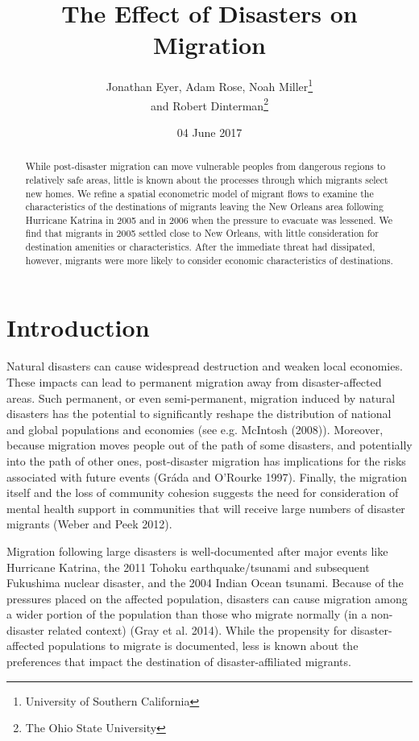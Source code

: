 \documentclass[]{article}
\title{The Effect of Disasters on Migration}
\author{Jonathan Eyer, Adam Rose, Noah Miller\footnote{University of Southern
  California} \\ and Robert Dinterman\footnote{The Ohio State University}}
\date{04 June 2017}
\begin{document}
\maketitle
\begin{abstract}
While post-disaster migration can move vulnerable peoples from dangerous
regions to relatively safe areas, little is known about the processes
through which migrants select new homes. We refine a spatial econometric
model of migrant flows to examine the characteristics of the
destinations of migrants leaving the New Orleans area following
Hurricane Katrina in 2005 and in 2006 when the pressure to evacuate was
lessened. We find that migrants in 2005 settled close to New Orleans,
with little consideration for destination amenities or characteristics.
After the immediate threat had dissipated, however, migrants were more
likely to consider economic characteristics of destinations.
\end{abstract}

\newpage

\section{Introduction}\label{introduction}

Natural disasters can cause widespread destruction and weaken local
economies. These impacts can lead to permanent migration away from
disaster-affected areas. Such permanent, or even semi-permanent,
migration induced by natural disasters has the potential to
significantly reshape the distribution of national and global
populations and economies (see e.g. McIntosh (2008)). Moreover, because
migration moves people out of the path of some disasters, and
potentially into the path of other ones, post-disaster migration has
implications for the risks associated with future events (Gráda and
O'Rourke 1997). Finally, the migration itself and the loss of community
cohesion suggests the need for consideration of mental health support in
communities that will receive large numbers of disaster migrants (Weber
and Peek 2012).

Migration following large disasters is well-documented after major
events like Hurricane Katrina, the 2011 Tohoku earthquake/tsunami and
subsequent Fukushima nuclear disaster, and the 2004 Indian Ocean
tsunami. Because of the pressures placed on the affected population,
disasters can cause migration among a wider portion of the population
than those who migrate normally (in a non-disaster related context)
(Gray et al. 2014). While the propensity for disaster-affected
populations to migrate is documented, less is known about the
preferences that impact the destination of disaster-affiliated migrants.
\end{document}
